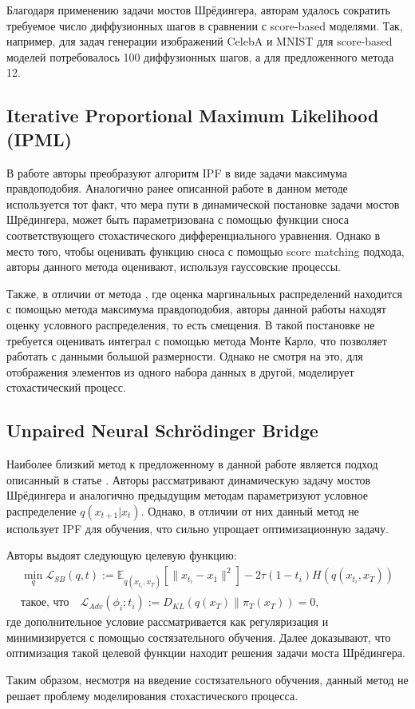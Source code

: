 Благодаря применению задачи мостов Шрёдингера, авторам удалось сократить требуемое число диффузионных шагов в сравнении с score-based моделями. Так, например, для задач генерации изображений CelebA и MNIST для score-based моделей потребовалось 100 диффузионных шагов, а для предложенного метода \cite{dsb} 12.

\subsection{Iterative Proportional Maximum Likelihood (IPML)}
В работе \cite{mle-sb} авторы преобразуют алгоритм IPF в виде задачи максимума правдоподобия. Аналогично ранее описанной работе в данном методе используется тот факт, что мера пути в динамической постановке задачи мостов Шрёдингера, может быть параметризована с помощью функции сноса соответствующего стохастического дифференциального уравнения. Однако в место того, чтобы оценивать функцию сноса с помощью score matching подхода, авторы данного метода оценивают, используя гауссовские процессы.

Также, в отличии от метода \cite{pavon-empiric-fortret}, где оценка маргинальных распределений находится с помощью метода максимума правдоподобия, авторы данной работы находят оценку условного распределения, то есть смещения. В такой постановке не требуется оценивать интеграл с помощью метода Монте Карло, что позволяет работать с данными большой размерности. Однако не смотря на это, для отображения элементов из одного набора данных в другой, моделирует стохастический процесс.

\subsection{Unpaired Neural Schrödinger Bridge}
Наиболее близкий метод к предложенному в данной работе является подход описанный в статье \cite{cycle-sb}. Авторы рассматривают динамическую задачу мостов Шрёдингера и аналогично предыдущим методам параметризуют условное распределение $q(x_{t+1}|x_t)$. Однако, в отличии от них данный метод не использует IPF для обучения, что сильно упрощает оптимизационную задачу. 

Авторы выдоят следующую целевую функцию:
\begin{equation*}
    \begin{split}
        \min_{q} \mathcal{L}_{SB}(q, t) := \mathbb{E}_{q(x_{t_i}, x_T)} \left[ \|x_{t_i} - x_1\|^2 \right] - 2\tau(1 - t_i) H(q(x_{t_i}, x_T)) \\
        \text{такое, что} \quad \mathcal{L}_{Adv}(\phi_i; t_i) := D_{KL}(q(x_T) \| \pi_T(x_T)) = 0,
    \end{split}
\end{equation*}
где дополнительное условие рассматривается как регуляризация и минимизируется с помощью состязательного обучения. Далее доказывают, что оптимизация такой целевой функции находит решения задачи моста Шрёдингера.

Таким образом, несмотря на введение состязательного обучения, данный метод не решает проблему моделирования стохастического процесса.

\newpage
